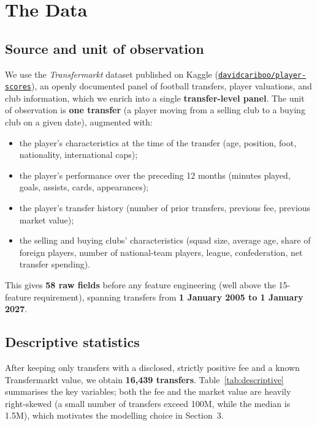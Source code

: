\documentclass[11pt]{article}
\begin{document}
\section{The Data}

\subsection{Source and unit of observation}
We use the \emph{Transfermarkt} dataset published on Kaggle
(\href{https://www.kaggle.com/datasets/davidcariboo/player-scores}{\texttt{davidcariboo/player-scores}}),
an openly documented panel of football transfers, player valuations, and
club information, which we enrich into a single \textbf{transfer-level panel}.
The unit of observation is \textbf{one transfer} (a player moving from a
selling club to a buying club on a given date), augmented with:
\begin{itemize}
    \item the player's characteristics at the time of the transfer (age,
    position, foot, nationality, international caps);
    \item the player's performance over the preceding 12 months (minutes
    played, goals, assists, cards, appearances);
    \item the player's transfer history (number of prior transfers, previous
    fee, previous market value);
    \item the selling and buying clubs' characteristics (squad size, average
    age, share of foreign players, number of national-team players, league,
    confederation, net transfer spending).
\end{itemize}
This gives \textbf{58 raw fields} before any feature engineering (well above
the 15-feature requirement), spanning transfers from \textbf{1 January 2005 to
1 January 2027}.

\subsection{Descriptive statistics}
After keeping only transfers with a disclosed, strictly positive fee and a
known Transfermarkt value, we obtain \textbf{16{,}439 transfers}. Table~\ref{tab:descriptive}
summarises the key variables; both the fee and the market value are heavily
right-skewed (a small number of transfers exceed \texteuro{}100M, while the median
is \texteuro{}1.5M), which motivates the modelling choice in Section~3.
\end{document}
